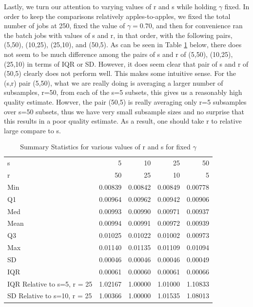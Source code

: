 \documentclass[a4paper, 11pt]{report}
\begin{document}
\begin{enumerate}
	    	Lastly, we turn our attention to varying values of r and s while holding $\gamma$ fixed.  In order to keep the comparisons relatively apples-to-apples, we fixed the total number of jobs at 250, fixed the value of $\gamma=0.70$, and then for convenience ran the batch jobs with values of s and r, in that order, with the following pairs, (5,50), (10,25), (25,10), and (50,5).  As can be seen in Table \ref{rstable} below, there does not seem to be much difference among the pairs of s and r of (5,50), (10,25), (25,10) in terms of IQR or SD.  However, it does seem clear that pair of s and r of (50,5) clearly does not perform well.  This makes some intuitive sense.  For the (s,r) pair (5,50), what we are really doing is averaging a larger number of subsamples, r=50, from each of the s=5 subsets, this gives us a reasonably high quality estimate.  Howver, the pair (50,5) is really averaging only r=5 subsamples over s=50 subsets, thus we have very small subsample sizes and no surprise that this results in a poor quality estimate.  As a result, one should take r to relative large compare to s.
	    	\begin{table}[H]
		    	\centering \footnotesize
		    	\begin{tabular}{lrrrr}
		    	  \hline
		    		s & 5 & 10 & 25 & 50 \\ 	    	
		    	  	r & 50 & 25 & 10 & 5 \\ 
		    	  \hline
		    	  Min & 0.00839 & 0.00842 & 0.00849 & 0.00778 \\ 
		    	  Q1 & 0.00964 & 0.00962 & 0.00942 & 0.00906 \\ 
		    	  Med & 0.00993 & 0.00990 & 0.00971 & 0.00937 \\ 
		    	  Mean & 0.00994 & 0.00991 & 0.00972 & 0.00939 \\ 
		    	  Q3 & 0.01025 & 0.01022 & 0.01002 & 0.00973 \\ 
		    	  Max & 0.01140 & 0.01135 & 0.01109 & 0.01094 \\ 
		    	  SD & 0.00046 & 0.00046 & 0.00046 & 0.00049 \\ 
		    	  IQR & 0.00061 & 0.00060 & 0.00061 & 0.00066 \\ 
		    	  IQR Relative to s=5, r = 25 & 1.02167 & 1.00000 & 1.01000 & 1.10833 \\
		    	  SD Relative to s=10, r = 25 & 1.00366 & 1.00000 & 1.01535 & 1.08013 \\
		    	   \hline
		    	\end{tabular}
				\caption{Summary Statistics for various values of r and s for fixed $\gamma$}
				\label{rstable}
	    	\end{table}
	    

\end{enumerate}
\end{document}
